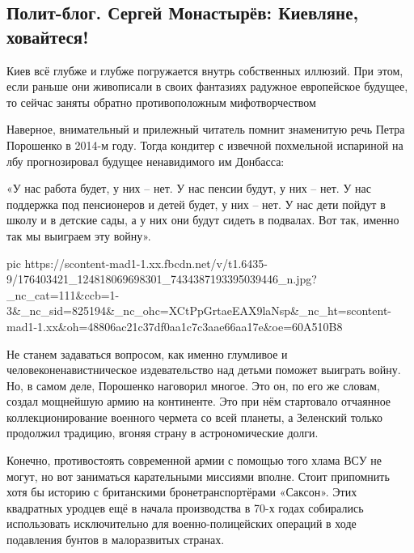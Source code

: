  
 
 
 
 
\subsection{Полит-блог. Сергей Монастырёв:  Киевляне, ховайтеся!}

Киев всё глубже и глубже погружается внутрь собственных иллюзий. При этом, если
раньше они живописали в своих фантазиях радужное европейское будущее, то сейчас
заняты обратно противоположным мифотворчеством

Наверное, внимательный и прилежный читатель помнит знаменитую речь Петра
Порошенко в 2014-м году. Тогда кондитер с извечной похмельной испариной на лбу
прогнозировал будущее ненавидимого им Донбасса:

«У нас работа будет, у них – нет. У нас пенсии будут, у них – нет. У нас
поддержка под пенсионеров и детей будет, у них – нет. У нас дети пойдут в школу
и в детские сады, а у них они будут сидеть в подвалах. Вот так, именно так мы
выиграем эту войну».

\ifcmt
  pic https://scontent-mad1-1.xx.fbcdn.net/v/t1.6435-9/176403421_124818069698301_7434387193395039446_n.jpg?_nc_cat=111&ccb=1-3&_nc_sid=825194&_nc_ohc=XCtPpGrtaeEAX9laNsp&_nc_ht=scontent-mad1-1.xx&oh=48806ac21c37df0aa1c7c3aae66aa17e&oe=60A510B8
\fi

Не станем задаваться вопросом, как именно глумливое и человеконенавистническое
издевательство над детьми поможет выиграть войну. Но, в самом деле, Порошенко
наговорил многое. Это он, по его же словам, создал мощнейшую армию на
континенте. Это при нём стартовало отчаянное коллекционирование военного
чермета со всей планеты, а Зеленский только продолжил традицию, вгоняя страну в
астрономические долги.

Конечно, противостоять современной армии с помощью того хлама ВСУ не могут, но
вот заниматься карательными миссиями вполне. Стоит припомнить хотя бы историю с
британскими бронетранспортёрами «Саксон». Этих квадратных уродцев ещё в начала
производства в 70-х годах собирались использовать исключительно для
военно-полицейских операций в ходе подавления бунтов в малоразвитых странах.

